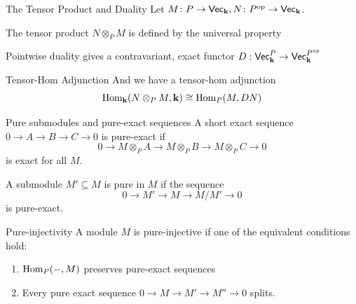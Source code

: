 \documentclass{beamer}
\begin{document}
    \begin{frame}{The Tensor Product and Duality}
        Let $M\colon P\to\normalfont\mathsf{Vec}_{\textbf{k}}, N\colon P^{\text{op}}\to\normalfont\mathsf{Vec}_{\textbf{k}}$.\pause
        
        The tensor product $N\otimes_P M$ is defined by the universal property
        \begin{center}
        \end{center}\pause
        Pointwise duality gives a contravariant, exact functor $D:\normalfont\mathsf{Vec}_{\textbf{k}}^{P}\to\normalfont\mathsf{Vec}_{\textbf{k}}^{P^{op}}$
        \begin{center}
        \end{center}
    \end{frame}

    \begin{frame}{Tensor-Hom Adjunction}
        And we have a tensor-hom adjunction
        \[ \normalfont\text{Hom}_{\mathbf{k}}(N\otimes_P M,\mathbf{k})\cong\normalfont\text{Hom}_P(M, DN) \]
    \end{frame}

    \begin{frame}{Pure submodules and pure-exact sequences}
        A short exact sequence $0\to A\to B\to C\to 0$ is \alert{pure-exact} if
        \[ 0\to M\otimes_P A\to M\otimes_P B\to M\otimes_P C\to 0 \]
        is exact for all $M$.\pause

        A submodule $M'\subseteq M$ is \alert{pure} in $M$ if the sequence
        \[ 0\to M'\to M\to M/M'\to 0 \]
        is pure-exact.
    \end{frame}
    
    \begin{frame}{Pure-injectivity}
        A module $M$ is \alert{pure-injective} if one of the equivalent conditions hold:\pause
        \begin{enumerate}
            \item $\normalfont\text{Hom}_P(-, M)$ preserves pure-exact sequences\pause
            \item Every pure exact sequence $0\to M\to M'\to M''\to 0$ splits.
        \end{enumerate}
    \end{frame}
\end{document}
